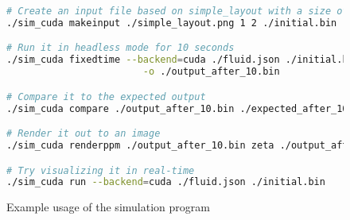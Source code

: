 \begin{figure}[ht]
    \centering
    \begin{lstlisting}[language=bash]
# Create an input file based on simple_layout with a size of 1x2 metres
./sim_cuda makeinput ./simple_layout.png 1 2 ./initial.bin

# Run it in headless mode for 10 seconds
./sim_cuda fixedtime --backend=cuda ./fluid.json ./initial.bin 10 \
                        -o ./output_after_10.bin

# Compare it to the expected output
./sim_cuda compare ./output_after_10.bin ./expected_after_10.bin

# Render it out to an image
./sim_cuda renderppm ./output_after_10.bin zeta ./output_after_10.ppm

# Try visualizing it in real-time
./sim_cuda run --backend=cuda ./fluid.json ./initial.bin
\end{lstlisting}
    \caption{Example usage of the simulation program}
    \label{fig:BashExampleUsage}
\end{figure}